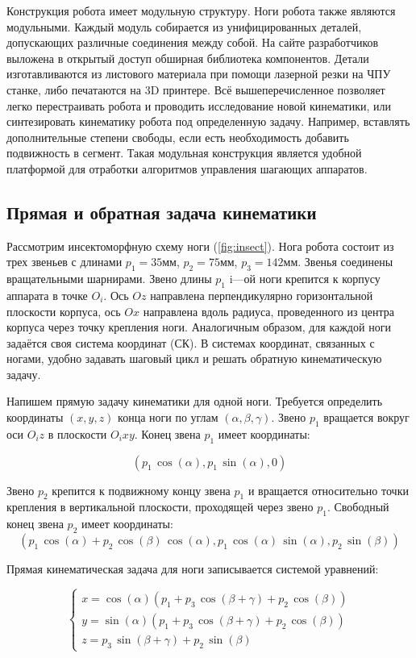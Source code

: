 Конструкция робота имеет модульную структуру. Ноги робота также являются модульными. Каждый модуль собирается из унифицированных деталей, допускающих различные соединения между собой. На сайте разработчиков выложена в открытый доступ обширная библиотека компонентов. Детали изготавливаются из листового материала при помощи лазерной резки на ЧПУ станке, либо печатаются на 3D принтере. Всё вышеперечисленное позволяет легко перестраивать робота и проводить исследование новой кинематики, или синтезировать кинематику робота под определенную задачу. Например, вставлять дополнительные степени свободы, если есть необходимость добавить подвижность в сегмент. Такая модульная конструкция является удобной платформой для отработки алгоритмов управления шагающих аппаратов.


\subsection{Прямая и обратная задача кинематики}

Рассмотрим инсектоморфную схему ноги (\ref{fig:insect}). Нога робота состоит из трех звеньев с длинами $p_1=35$мм, $p_2=75$мм, $p_3=142$мм. Звенья соединены вращательными шарнирами. Звено длины $p_1$ i---ой ноги крепится к корпусу аппарата в точке $O_i$. Ось $Oz$  направлена перпендикулярно горизонтальной плоскости корпуса, ось $Ox$  направлена вдоль радиуса, проведенного из центра корпуса через точку крепления ноги. Аналогичным образом, для каждой ноги задаётся своя система координат (СК). В системах координат, связанных с ногами, удобно задавать шаговый цикл и решать обратную кинематическую задачу.

Напишем прямую задачу кинематики для одной ноги. Требуется определить координаты $(x,y,z)$ конца ноги по углам $(\alpha,\beta,\gamma)$. Звено $p_1$ вращается вокруг оси $O_iz$ в плоскости $O_ixy$. Конец звена $p_1$ имеет координаты:

$$(p_1\,\cos(\alpha),p_1\,\sin(\alpha),0)$$

Звено $p_2$ крепится к подвижному концу звена $p_1$ и вращается относительно точки крепления в вертикальной плоскости, проходящей через звено $p_1$. Свободный конец звена $p_2$ имеет координаты: $$(p_1\,\cos(\alpha)+p_2\,\cos(\beta)\,\cos(\alpha),p_1\,\cos(\alpha)\,\sin(\alpha),p_2\,\sin(\beta))$$

Прямая кинематическая задача для ноги записывается системой уравнений:

\begin{equation}
\left\{
\begin{array}{lcr}
x = \cos(\alpha)(p_1+p_3\,\cos(\beta+\gamma)+p_2\,\cos(\beta))\\
y = \sin(\alpha)(p_1+p_3\,\cos(\beta+\gamma)+p_2\,\cos(\beta))\\
z = p_3\,\sin(\beta+\gamma)+p_2\,\sin(\beta)
\end{array}
\right.
\end{equation}
 
